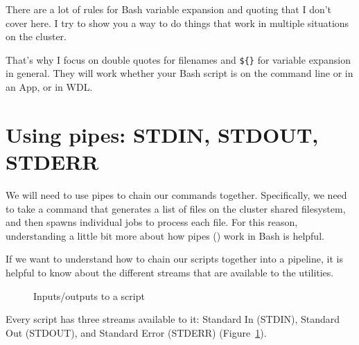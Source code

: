\documentclass[
  letterpaper,
  DIV=11,
  numbers=noendperiod]{scrreprt}
\begin{document}
\begin{tcolorbox}[enhanced jigsaw, colbacktitle=quarto-callout-note-color!10!white, left=2mm, toprule=.15mm, toptitle=1mm, opacityback=0, bottomrule=.15mm, breakable, leftrule=.75mm, colframe=quarto-callout-note-color-frame, bottomtitle=1mm, titlerule=0mm, coltitle=black, title=\textcolor{quarto-callout-note-color}{\faInfo}\hspace{0.5em}{What about X use case?}, rightrule=.15mm, arc=.35mm, opacitybacktitle=0.6, colback=white]

There are a lot of rules for Bash variable expansion and quoting that I
don't cover here. I try to show you a way to do things that work in
multiple situations on the cluster.

That's why I focus on double quotes for filenames and \texttt{\$\{\}}
for variable expansion in general. They will work whether your Bash
script is on the command line or in an App, or in WDL.

\end{tcolorbox}

\section{Using pipes: STDIN, STDOUT,
STDERR}\label{using-pipes-stdin-stdout-stderr}

We will need to use pipes to chain our commands together. Specifically,
we need to take a command that generates a list of files on the cluster
shared filesystem, and then spawns individual jobs to process each file.
For this reason, understanding a little bit more about how pipes
(\texttt{\textbar{}}) work in Bash is helpful.

If we want to understand how to chain our scripts together into a
pipeline, it is helpful to know about the different streams that are
available to the utilities.

\begin{figure}


\caption{\label{fig-std}Inputs/outputs to a script}

\end{figure}%

Every script has three streams available to it: Standard In (STDIN),
Standard Out (STDOUT), and Standard Error (STDERR)
(Figure~\ref{fig-std}).
\end{document}
